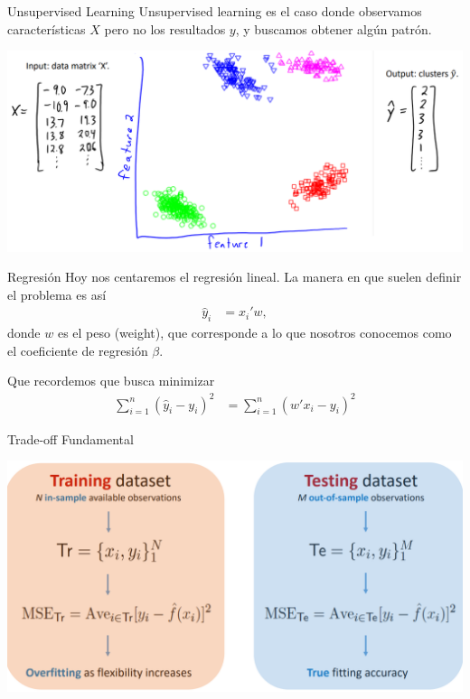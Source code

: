 \documentclass[11pt,handout,aspectratio=169]{beamer}
\begin{document}
\begin{frame}{Unsupervised Learning}
Unsupervised learning es el caso donde observamos características $X$ pero no los resultados $y$, y buscamos obtener algún patrón.

\begin{center}
\includegraphics[scale=0.5]{unsupervised2.png}
\end{center}

\end{frame}


\begin{frame}{Regresión}
Hoy nos centaremos el regresión lineal. La manera en que suelen definir el problema es así
\begin{align*}
\hat{y}_i &= x_i'w ,
\end{align*}
donde $w$ es el peso (weight), que corresponde a lo que nosotros conocemos como el coeficiente de regresión $\beta$.
\vspace{0.8cm}

Que recordemos que busca minimizar 
\begin{align*}
\sum_{i=1}^n (\hat{y}_i - y_i )^2 &= \sum_{i=1}^n (w' x_i - y_i )^2 
\end{align*}

\end{frame}


\begin{frame}{Trade-off Fundamental}
\begin{center}
\includegraphics[scale=0.4]{mse_traintest.png}
\end{center}
\end{frame}
\end{document}
